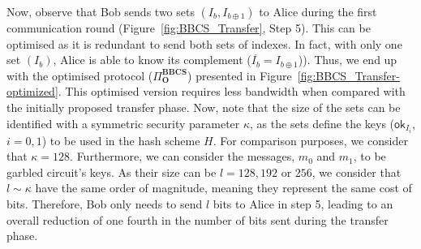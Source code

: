 Now, observe that Bob sends two sets $(I_b, I_{b\oplus 1})$ to Alice during the first communication round (Figure~\ref{fig:BBCS_Transfer}, Step 5). This can be optimised as it is redundant to send both sets of indexes. In fact, with only one set $(I_b)$, Alice is able to know its complement ($\overline{I_b} = I_{b\oplus 1}$)). Thus, we end up with the optimised protocol ($\Pi^{\textbf{BBCS}}_{\textbf{O}}$) presented in Figure~\ref{fig:BBCS_Transfer-optimized}. This optimised version requires less bandwidth when compared with the initially proposed transfer phase. Now, note that the size of the sets can be identified with a symmetric security parameter $\kappa$, as the sets define the keys ($\mathsf{ok}_{I_i}$, $i=0,1$) to be used in the hash scheme $H$. For comparison purposes, we consider that $\kappa = 128$. Furthermore, we can consider the messages, $m_0$ and $m_1$, to be garbled circuit's keys. As their size can be $l = 128, 192$ or $256$, we consider that $l\sim \kappa$ have the same order of magnitude, meaning they represent the same cost of bits. Therefore, Bob only needs to send $l$ bits to Alice in step 5, leading to an overall reduction of one fourth in the number of bits sent during the transfer phase. 

